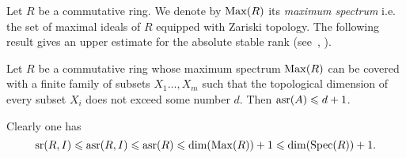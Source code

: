 Let $R$ be a commutative ring. We denote by $\operatorname{Max}(R)$ its \emph{maximum spectrum} i.e. the set of maximal ideals of $R$ equipped with Zariski topology.
The following result gives an upper estimate for the absolute stable rank (see~\cite[Theorem~2.3]{EO}, \cite[Theorem~3.7]{MKV}).
\begin{thm}
Let $R$ be a commutative ring whose maximum spectrum $\operatorname{Max}(R)$ can be covered with a finite family of subsets $X_1\ldots, X_m$ such that the topological dimension of every subset $X_i$ does not exceed some number $d$. Then $\operatorname{asr}(A)\leqslant d+1$.
\end{thm}
Clearly one has
\[ \operatorname{sr}(R,I)\leqslant\operatorname{asr}(R,I)\leqslant\operatorname{asr}(R)\leqslant \dim(\operatorname{Max}(R))+1\leqslant\dim(\operatorname{Spec}(R))+1. \]